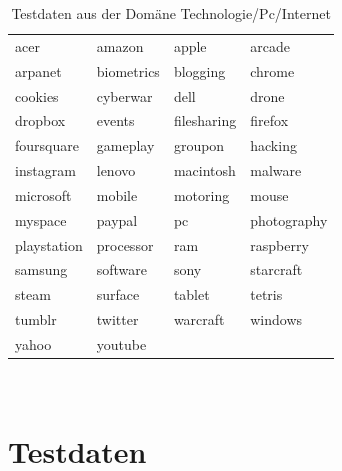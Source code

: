 \documentclass[12pt,a4paper]{report}
\begin{document}
\begin{table}[H]
\caption{Testdaten aus der Domäne Technologie/Pc/Internet}
\begin{center}
\begin{tabular}{l|l|l|l}
acer & amazon & apple & arcade\\
arpanet & biometrics & blogging & chrome\\
cookies & cyberwar & dell & drone\\
dropbox & events & filesharing & firefox\\
foursquare & gameplay & groupon & hacking\\
instagram & lenovo & macintosh & malware\\
microsoft & mobile & motoring & mouse\\
myspace & paypal & pc & photography\\
playstation & processor & ram & raspberry\\
samsung & software & sony & starcraft\\
steam & surface & tablet & tetris\\
tumblr & twitter & warcraft & windows\\
yahoo & youtube &  & \\
\end{tabular}\\
\end{center}
\end{table}

\newpage
	\section{Testdaten}
	\label{sec:Testdaten}
\end{document}
